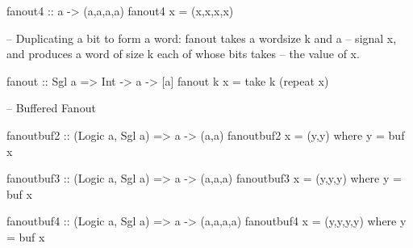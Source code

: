 \documentclass[]{svmono}
\begin{document}
fanout4 :: a -> (a,a,a,a)
fanout4 x = (x,x,x,x)

-- Duplicating a bit to form a word: fanout takes a wordsize k and a
-- signal x, and produces a word of size k each of whose bits takes
-- the value of x.

fanout :: Sgl a => Int -> a -> [a]
fanout k x = take k (repeat x)


-- Buffered Fanout

fanoutbuf2 :: (Logic a, Sgl a) => a -> (a,a)
fanoutbuf2 x = (y,y)
  where y = buf x

fanoutbuf3 :: (Logic a, Sgl a) => a -> (a,a,a)
fanoutbuf3 x = (y,y,y)
  where y = buf x

fanoutbuf4 :: (Logic a, Sgl a) => a -> (a,a,a,a)
fanoutbuf4 x = (y,y,y,y)
  where y = buf x
\end{document}
